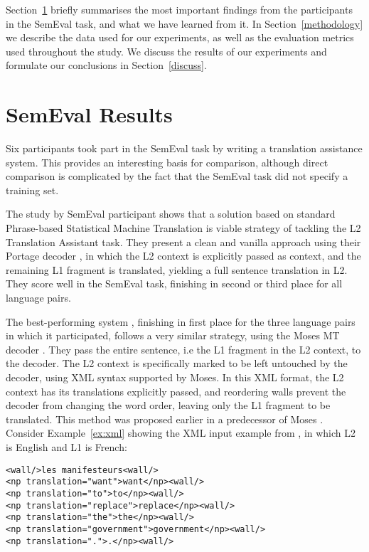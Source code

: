 Section~\ref{previous} briefly summarises the most important findings from the
participants in the SemEval task, and what we have learned from it.  In
Section~\ref{methodology} we describe the data used for our experiments, as
well as the evaluation metrics used throughout the study. We discuss the
results of our experiments and formulate our conclusions in
Section~\ref{discuss}.

\section{SemEval Results} %
\label{previous}
\label{sec:participants}

Six participants took part in the SemEval task by writing a translation
assistance system. This provides an interesting basis for comparison,
although direct comparison is complicated by the fact that the SemEval task did
not specify a training set. 

The study by SemEval participant \cite{CNRC} shows that a solution based on
standard Phrase-based Statistical Machine Translation is viable strategy of
tackling the L2 Translation Assistant task. They present a clean and vanilla
approach using their Portage decoder \citep{PORTAGE}, in which the L2 context
is explicitly passed as context, and the remaining L1 fragment is translated,
yielding a full sentence translation in L2. They score well in the SemEval
task, finishing in second or third place for all language pairs.

The best-performing system \citep{UEDIN}, finishing in first place for
the three language pairs in which it participated, follows a very similar
strategy, using the Moses MT decoder \citep{MOSES}. They pass the
entire sentence, i.e the L1 fragment in the L2 context, to the
decoder. The L2 context is specifically marked to be left untouched by
the decoder, using XML syntax supported by Moses. In this XML format,
the L2 context has its translations explicitly passed, and reordering
walls prevent the decoder from changing the word order, leaving only
the L1 fragment to be translated. This method was proposed
earlier in a predecessor of Moses \citep{Cabezas+05}. Consider
Example~\ref{ex:xml} showing the XML input example from \cite{UEDIN},
in which L2 is English and L1 is French:

\begin{exmp}
\label{ex:xml}
\begin{lstlisting}
<wall/>les manifesteurs<wall/>
<np translation="want">want</np><wall/>
<np translation="to">to</np><wall/>
<np translation="replace">replace</np><wall/>
<np translation="the">the</np><wall/>
<np translation="government">government</np><wall/>
<np translation=".">.</np><wall/>
\end{lstlisting}
\end{exmp}

